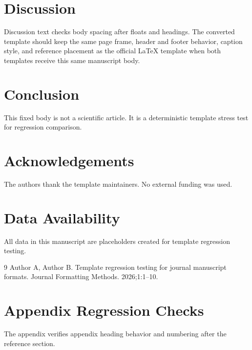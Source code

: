 \section{Discussion}
Discussion text checks body spacing after floats and headings. The converted template should keep the same page frame, header and footer behavior, caption style, and reference placement as the official LaTeX template when both templates receive this same manuscript body.

\section{Conclusion}
This fixed body is not a scientific article. It is a deterministic template stress test for regression comparison.

\section*{Acknowledgements}
The authors thank the template maintainers. No external funding was used.

\section*{Data Availability}
All data in this manuscript are placeholders created for template regression testing.

\begin{thebibliography}{9}
Author A, Author B. Template regression testing for journal manuscript formats. Journal Formatting Methods. 2026;1:1--10.
\end{thebibliography}

\appendix
\section{Appendix Regression Checks}
The appendix verifies appendix heading behavior and numbering after the reference section.
